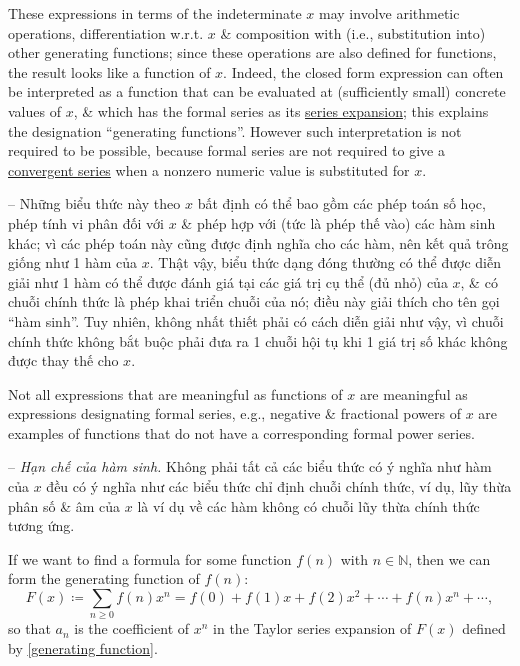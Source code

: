 \documentclass[oneside]{book}
\begin{document}
These expressions in terms of the indeterminate $x$ may involve arithmetic operations, differentiation w.r.t. $x$ \& composition with (i.e., substitution into) other generating functions; since these operations are also defined for functions, the result looks like a function of $x$. Indeed, the closed form expression can often be interpreted as a function that can be evaluated at (sufficiently small) concrete values of $x$, \& which has the formal series as its \href{https://en.wikipedia.org/wiki/Series_expansion}{series expansion}; this explains the designation ``generating functions''. However such interpretation is not required to be possible, because formal series are not required to give a \href{https://en.wikipedia.org/wiki/Convergent_series}{convergent series} when a nonzero numeric value is substituted for $x$.

-- Những biểu thức này theo $x$ bất định có thể bao gồm các phép toán số học, phép tính vi phân đối với $x$ \& phép hợp với (tức là phép thế vào) các hàm sinh khác; vì các phép toán này cũng được định nghĩa cho các hàm, nên kết quả trông giống như 1 hàm của $x$. Thật vậy, biểu thức dạng đóng thường có thể được diễn giải như 1 hàm có thể được đánh giá tại các giá trị cụ thể (đủ nhỏ) của $x$, \& có chuỗi chính thức là phép khai triển chuỗi của nó; điều này giải thích cho tên gọi ``hàm sinh''. Tuy nhiên, không nhất thiết phải có cách diễn giải như vậy, vì chuỗi chính thức không bắt buộc phải đưa ra 1 chuỗi hội tụ khi 1 giá trị số khác không được thay thế cho $x$.

 Not all expressions that are meaningful as functions of $x$ are meaningful as expressions designating formal series, e.g., negative \& fractional powers of $x$ are examples of functions that do not have a corresponding formal power series.

-- {\it Hạn chế của hàm sinh.} Không phải tất cả các biểu thức có ý nghĩa như hàm của $x$ đều có ý nghĩa như các biểu thức chỉ định chuỗi chính thức, ví dụ, lũy thừa phân số \& âm của $x$ là ví dụ về các hàm không có chuỗi lũy thừa chính thức tương ứng.

 If we want to find a formula for some function $f(n)$ with $n\in\mathbb{N}$, then we can form the generating function of $f(n)$:
\begin{equation}
	\label{generating function}
	\tag{genf}
	F(x)\coloneqq\sum_{n\ge0} f(n)x^n = f(0) + f(1)x + f(2)x^2 + \cdots + f(n)x^n + \cdots,
\end{equation}
so that $a_n$ is the coefficient of $x^n$ in the Taylor series expansion of $F(x)$ defined by \eqref{generating function}.
\end{document}
